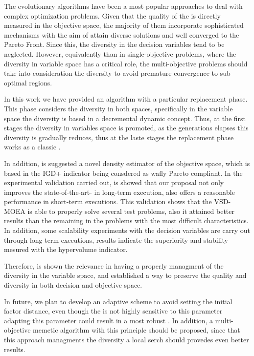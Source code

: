 The evolutionary algorithms have been a most popular approaches to deal with complex optimization problems.
%
Given that the quality of the \MOEAS{} is directly measured in the objective space, the majority of them incorporate sophisticated mechanisms with the aim of attain diverse solutions and well converged to the Pareto Front.
%
Since this, the diversity in the decision variables tend to be neglected.
%
However, equivalently than in single-objective problems, where the diversity in variable space has a critical role, the multi-objective problems should take into consideration the diversity to avoid premature convergence to sub-optimal regions.
%

In this work we have provided an algorithm with a particular replacement phase.
%
This phase considers the diversity in both spaces, specifically in the variable space the diversity is based in a decremental dynamic concept.
%
Thus, at the first stages the diversity in variables space is promoted, as the generations elapses this diversity is gradually reduces, thus at the laste stages the replacement phase works as a classic \MOEA{}.
%

In addition, is suggested a novel density estimator of the objective space, which is based in the IGD+ indicator being consdered as wafly Pareto compliant.
%
In the experimental validation carried out, is showed that our proposal not only improves the state-of-the-art-\MOEAS{} in long-term execution, also offers a reasonable performance in short-term executions.
%
This validation shows that the VSD-MOEA is able to properly solve several test problems, also it attained better results than the remaining \MOEAS{} in the problems with the most difficult characteristics.
%
In addition, some scalability experiments with the decision variables are carry out through long-term executions, results indicate the superiority and stability mesured with the hypervolume indicator.

Therefore, is shown the relevance in having a properly managment of the diversity in the variable space, and established a way to preserve the quality and diversity in both decision and objective space.


In future, we plan to develop an adaptive scheme to avoid setting the initial factor distance, even though the \VSDMOEA{} is not highly sensitive to this parameter adapting this parameter could result in a most robust \MOEA{}.
%
In addition, a multi-objective memetic algorithm with this principle should be proposed, since that this approach managments the diversity a local serch should provedes even better results.
